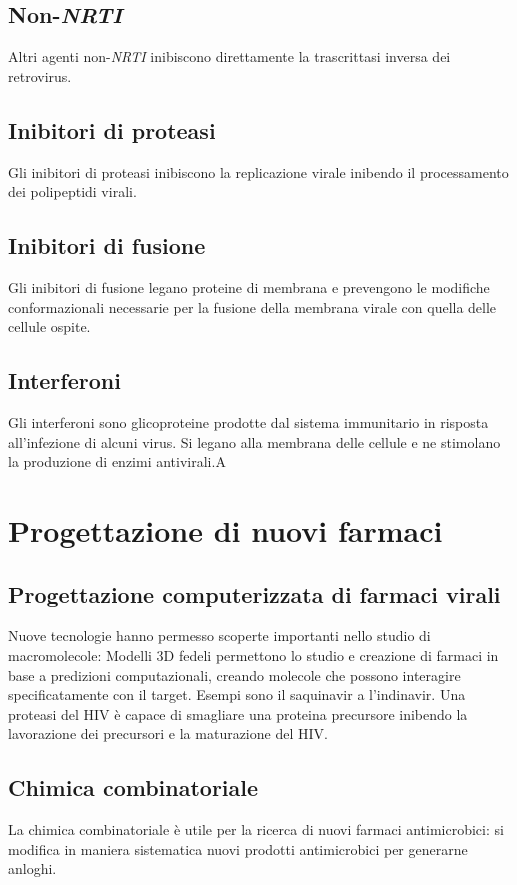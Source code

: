 	\subsection{Non-\emph{NRTI}}
	Altri agenti non-\emph{NRTI} inibiscono direttamente la trascrittasi inversa dei retrovirus.

	\subsection{Inibitori di proteasi}
	Gli inibitori di proteasi inibiscono la replicazione virale inibendo il processamento dei polipeptidi virali.

	\subsection{Inibitori di fusione}
	Gli inibitori di fusione legano proteine di membrana e prevengono le modifiche conformazionali necessarie per la fusione della membrana virale con quella delle cellule ospite.

	\subsection{Interferoni}
	Gli interferoni sono glicoproteine prodotte dal sistema immunitario in risposta all'infezione di alcuni virus.
	Si legano alla membrana delle cellule e ne stimolano la produzione di enzimi antivirali.A


\section{Progettazione di nuovi farmaci}

	\subsection{Progettazione computerizzata di farmaci virali}
	Nuove tecnologie hanno permesso scoperte importanti nello studio di macromolecole:
	Modelli 3D fedeli permettono lo studio e creazione di farmaci in base a predizioni computazionali, creando molecole che possono interagire specificatamente con il target.
	Esempi sono il saquinavir a l'indinavir.
	Una proteasi del HIV \`e capace di smagliare una proteina precursore inibendo la lavorazione dei precursori e la maturazione del HIV.

	\subsection{Chimica combinatoriale}
	La chimica combinatoriale \`e utile per la ricerca di nuovi farmaci antimicrobici: si modifica in maniera sistematica nuovi prodotti antimicrobici per generarne anloghi.
